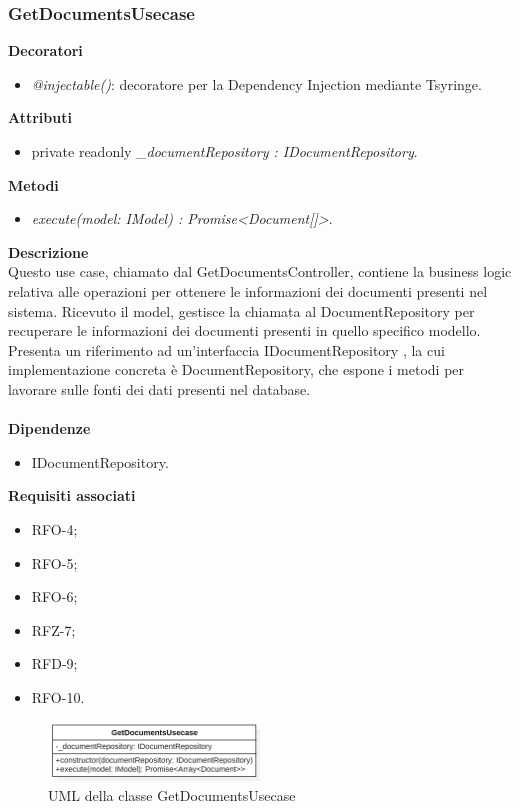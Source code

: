 \subsubsection{GetDocumentsUsecase}
\textbf{Decoratori}
\begin{itemize}
    \item \textit{@injectable()}: decoratore per la Dependency Injection mediante Tsyringe.
\end{itemize}
\textbf{Attributi}
\begin{itemize}[itemsep=-4pt]
    \item private readonly \textit{\_documentRepository : IDocumentRepository}.
\end{itemize}
\textbf{Metodi}
\begin{itemize}
    \item \textit{execute(model: IModel) : Promise<Document[]>}.
\end{itemize}
\textbf{Descrizione}\\
Questo use case, chiamato dal GetDocumentsController, contiene la business logic relativa alle operazioni per ottenere le informazioni dei documenti presenti nel sistema. Ricevuto il model, gestisce la chiamata al DocumentRepository per recuperare le informazioni dei documenti presenti in quello specifico modello.\\
Presenta un riferimento ad un'interfaccia IDocumentRepository , la cui implementazione concreta è DocumentRepository, che espone i metodi per lavorare sulle fonti dei dati presenti nel database.\\ \\
\textbf{Dipendenze}
\begin{itemize}
    \item IDocumentRepository.
\end{itemize}
\textbf{Requisiti associati}
\begin{itemize}[itemsep=-4pt]
    \item RFO-4;
    \item RFO-5;
    \item RFO-6;
    \item RFZ-7;
    \item RFD-9;
    \item RFO-10.
\end{itemize}

\begin{figure}[h!]
    \centering  
    \includegraphics[width=0.5\textwidth]{GetDocumentsUsecase.png}
    \caption{UML della classe GetDocumentsUsecase}
\end{figure}

